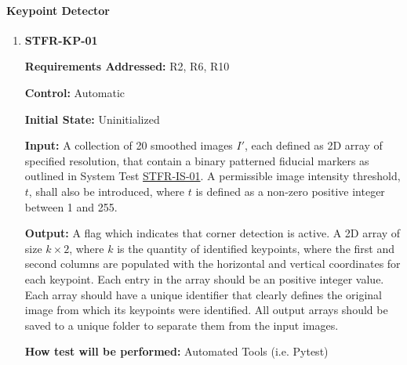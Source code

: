 \documentclass[12pt, titlepage]{article}
\begin{document}
\paragraph{Keypoint Detector}
\begin{enumerate}
\item \hypertarget{STFR-KP-01}{\textbf{STFR-KP-01}\\}
\textbf{Requirements Addressed:} R2, R6, R10

\textbf{Control:} Automatic	

\textbf{Initial State:} Uninitialized			

\textbf{Input:} A collection of 20 smoothed images $I'$, each defined as 2D array of specified resolution, that 
contain a binary patterned fiducial markers as outlined in System Test \hyperlink{STFR-IS-01}{STFR-IS-01}. 
A permissible image intensity threshold, $t$, shall also be introduced, where $t$ is defined as a non-zero 
positive integer between 1 and 255.

\textbf{Output:} A flag which indicates that corner detection is active. 
A 2D array of size ${k \times 2}$, where $k$ is the quantity of identified keypoints, 
where the first and second columns are populated with the horizontal and vertical coordinates for each 
keypoint. Each entry in the array should be an positive integer value. Each array should have a unique identifier that 
clearly defines the original image from which its keypoints were identified. All output arrays should be saved 
to a unique folder to separate them from the input images.

\textbf{How test will be performed:} Automated Tools (i.e. Pytest)
\end{enumerate}
\end{document}
